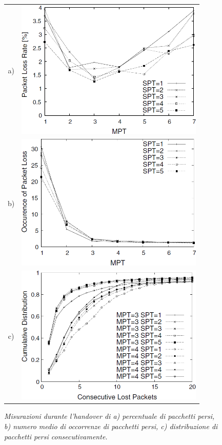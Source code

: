 \documentclass[12pt,a4paper,openright,twoside,draft]{book}
\begin{document}
\begin{figure}
  \centering
  \begin{tabular}{cc}
    a) & \includegraphics[width=9cm]{img/mona-sim-packet-loss-rate}  \\
    b) & \includegraphics[width=9cm]{img/mona-sim-packet-loss-occur} \\
    c) & \includegraphics[width=9cm]{img/mona-sim-packet-loss-distrib}  \\
  \end{tabular}
  \caption{\em Misurazioni durante l'handover di a) percentuale di
    pacchetti persi, b) numero medio di occorrenze di pacchetti persi,
    c) distribuzione di pacchetti persi consecutivamente.}
  \label{fig:mona:qos-sim-packet-loss}
\end{figure}
\end{document}
